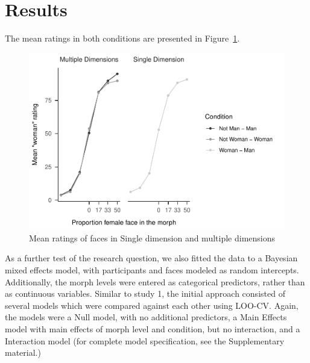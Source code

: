 \documentclass[
  man]{apa7}
\begin{document}
\hypertarget{results-1}{%
\section{Results}\label{results-1}}

The mean ratings in both conditions are presented in Figure~\ref{fig:descriptives-two}.

\begin{figure}
\centering
\includegraphics{papaja-test_files/figure-latex/descriptives-two-1.pdf}
\caption{\label{fig:descriptives-two}Mean ratings of faces in Single dimension and multiple dimensions}
\end{figure}

As a further test of the research question, we also fitted the data to a Bayesian mixed effects model, with participants and faces modeled as random intercepts. Additionally, the morph levels were entered as categorical predictors, rather than as continuous variables. Similar to study 1, the initial approach consisted of several models which were compared against each other using LOO-CV. Again, the models were a Null model, with no additional predictors, a Main Effects model with main effects of morph level and condition, but no interaction, and a Interaction model (for complete model specification, see the Supplementary material.)
\end{document}
